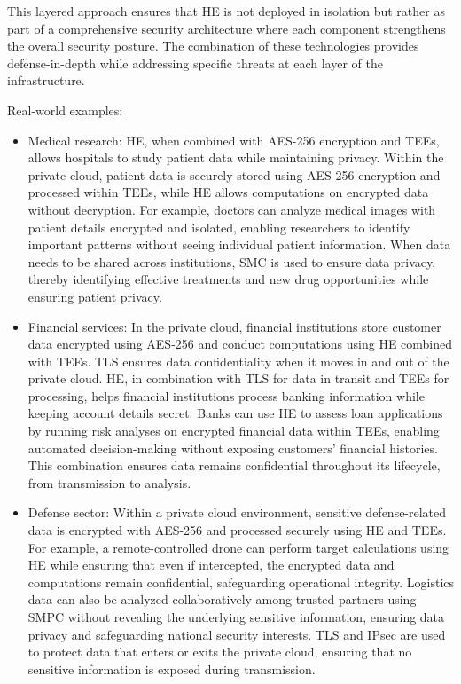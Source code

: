 \documentclass[
  letterpaper,
  DIV=11,
  numbers=noendperiod,
  oneside]{scrartcl}
\begin{document}
This layered approach ensures that HE is not deployed in isolation but
rather as part of a comprehensive security architecture where each
component strengthens the overall security posture. The combination of
these technologies provides defense-in-depth while addressing specific
threats at each layer of the infrastructure.

Real-world examples:

\begin{itemize}
\item
  Medical research: HE, when combined with AES-256 encryption and TEEs,
  allows hospitals to study patient data while maintaining privacy.
  Within the private cloud, patient data is securely stored using
  AES-256 encryption and processed within TEEs, while HE allows
  computations on encrypted data without decryption. For example,
  doctors can analyze medical images with patient details encrypted and
  isolated, enabling researchers to identify important patterns without
  seeing individual patient information. When data needs to be shared
  across institutions, SMC is used to ensure data privacy, thereby
  identifying effective treatments and new drug opportunities while
  ensuring patient privacy.
\item
  Financial services: In the private cloud, financial institutions store
  customer data encrypted using AES-256 and conduct computations using
  HE combined with TEEs. TLS ensures data confidentiality when it moves
  in and out of the private cloud. HE, in combination with TLS for data
  in transit and TEEs for processing, helps financial institutions
  process banking information while keeping account details secret.
  Banks can use HE to assess loan applications by running risk analyses
  on encrypted financial data within TEEs, enabling automated
  decision-making without exposing customers' financial histories. This
  combination ensures data remains confidential throughout its
  lifecycle, from transmission to analysis.
\item
  Defense sector: Within a private cloud environment, sensitive
  defense-related data is encrypted with AES-256 and processed securely
  using HE and TEEs. For example, a remote-controlled drone can perform
  target calculations using HE while ensuring that even if intercepted,
  the encrypted data and computations remain confidential, safeguarding
  operational integrity. Logistics data can also be analyzed
  collaboratively among trusted partners using SMPC without revealing
  the underlying sensitive information, ensuring data privacy and
  safeguarding national security interests. TLS and IPsec are used to
  protect data that enters or exits the private cloud, ensuring that no
  sensitive information is exposed during transmission.
\end{itemize}
\end{document}
